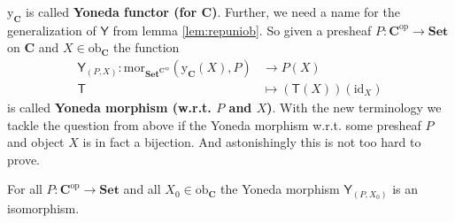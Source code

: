 $\mathrm{y}_{\mathbf{C}}$ is called \textbf{Yoneda functor (for $\mathbf{C}$)}. Further, we need a name for the generalization of $\mathsf{Y}$ from lemma \ref{lem:repuniob}. So given a presheaf $P \colon \mathbf{C}^{\mathrm{op}} \rightarrow \mathbf{Set}$ on $\mathbf{C}$ and $X \in \mathrm{ob}_{\mathbf{C}}$ the function
\begin{align*}
  \mathsf{Y}_{(P,X)}
  \colon
  \mathrm{mor}_{\mathbf{Set}^{\mathbf{C}^{\mathrm{op}}}}
  (\mathrm{y}_{\mathbf{C}}(X),P)
  &\rightarrow
  P(X)
  \\
  \mathsf{T}
  &\mapsto
  (\mathsf{T}(X))(\mathrm{id}_{X})
\end{align*}
is called \textbf{Yoneda morphism (w.r.t. $P$ and $X$)}. With the new terminology we tackle the question from above if the Yoneda morphism w.r.t. some presheaf $P$ and object $X$ is in fact a bijection. And astonishingly this is not too hard to prove.
\\
\begin{lem}[Yoneda]
\label{lem:yoneda}
For all $P \colon \mathbf{C}^{\mathrm{op}} \rightarrow \mathbf{Set}$ and all $X_{0} \in \mathrm{ob}_{\mathbf{C}}$ the Yoneda morphism $\mathsf{Y}_{(P,X_{0})}$ is an isomorphism.
\end{lem}

